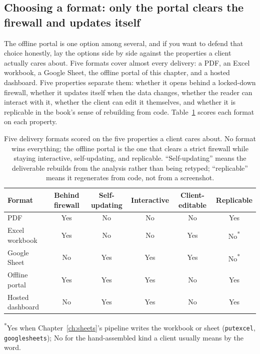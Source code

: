 \subsection{Choosing a format: only the portal clears the firewall and updates itself}
The offline portal is one option among several, and if you want to defend that choice honestly, lay the options side by side against the properties a client actually cares about. Five formats cover almost every delivery: a PDF, an Excel workbook, a Google Sheet, the offline portal of this chapter, and a hosted dashboard. Five properties separate them: whether it opens behind a locked-down firewall, whether it updates itself when the data changes, whether the reader can interact with it, whether the client can edit it themselves, and whether it is replicable in the book's sense of rebuilding from code. Table~\ref{tab:formats} scores each format on each property.

\begin{table}[htbp]
\centering
\footnotesize
\caption[Delivery formats compared]{Five delivery formats scored on the five properties a client cares about. No format wins everything; the offline portal is the one that clears a strict firewall while staying interactive, self-updating, and replicable. \enquote{Self-updating} means the deliverable rebuilds from the analysis rather than being retyped; \enquote{replicable} means it regenerates from code, not from a screenshot.}
\label{tab:formats}
\begin{tabular}{lccccc}
\hline
Format & Behind firewall & Self-updating & Interactive & Client-editable & Replicable \\
\hline
PDF               & Yes & No  & No  & No  & Yes \\
Excel workbook    & Yes & No  & No  & Yes & No\textsuperscript{*} \\
Google Sheet      & No  & Yes & Yes & Yes & No\textsuperscript{*} \\
Offline portal    & Yes & Yes & Yes & No  & Yes \\
Hosted dashboard  & No  & Yes & Yes & No  & Yes \\
\hline
\end{tabular}

{\footnotesize\textsuperscript{*}Yes when Chapter~\ref{ch:sheets}'s pipeline writes the workbook or sheet (\texttt{putexcel}, \texttt{googlesheets}); No for the hand-assembled kind a client usually means by the word.}
\end{table}


